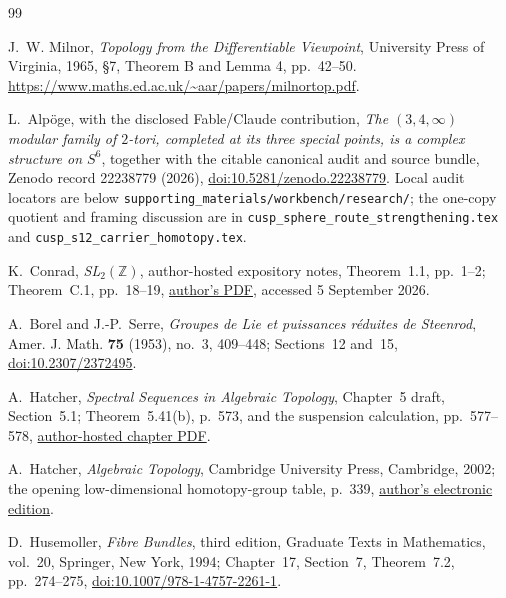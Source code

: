 \begingroup
\sloppy
\raggedright
\begin{thebibliography}{99}

J.~W. Milnor, \emph{Topology from the Differentiable Viewpoint},
University Press of Virginia, 1965, \S7, Theorem B and Lemma 4,
pp.~42--50.
\url{https://www.maths.ed.ac.uk/~aar/papers/milnortop.pdf}.



L.~Alp\"oge, with the disclosed Fable/Claude contribution,
\emph{The \((3,4,\infty)\) modular family of \(2\)-tori, completed at its
three special points, is a complex structure on \(S^6\)}, together with
the citable canonical audit and source bundle, Zenodo record 22238779
(2026), \href{https://doi.org/10.5281/zenodo.22238779}
{doi:10.5281/zenodo.22238779}.  Local audit locators are below
\texttt{supporting\_materials/workbench/research/}; the one-copy quotient
and framing discussion are in
\texttt{cusp\_sphere\_route\_strengthening.tex} and
\texttt{cusp\_s12\_carrier\_homotopy.tex}.

K.~Conrad, \emph{SL\(_2(\mathbb Z)\)}, author-hosted expository notes,
Theorem~1.1, pp.~1--2; Theorem~C.1, pp.~18--19,
\href{https://kconrad.math.uconn.edu/blurbs/grouptheory/SL(2,Z).pdf}
{author's PDF}, accessed 5 September 2026.

A.~Borel and J.-P.~Serre,
\emph{Groupes de Lie et puissances r\'eduites de Steenrod},
Amer. J. Math. \textbf{75} (1953), no.~3, 409--448;
Sections~12 and~15,
\href{https://doi.org/10.2307/2372495}{doi:10.2307/2372495}.

A.~Hatcher,
\emph{Spectral Sequences in Algebraic Topology}, Chapter~5 draft,
Section~5.1; Theorem~5.41(b), p.~573, and the suspension calculation,
pp.~577--578,
\href{https://pi.math.cornell.edu/~hatcher/AT/ATch5.pdf}
{author-hosted chapter PDF}.

A.~Hatcher,
\emph{Algebraic Topology},
Cambridge University Press, Cambridge, 2002; the opening
low-dimensional homotopy-group table, p.~339,
\href{https://pi.math.cornell.edu/~hatcher/AT/ATpage.html}
{author's electronic edition}.

D.~Husemoller,
\emph{Fibre Bundles}, third edition,
Graduate Texts in Mathematics, vol.~20, Springer, New York, 1994;
Chapter~17, Section~7, Theorem~7.2, pp.~274--275,
\href{https://doi.org/10.1007/978-1-4757-2261-1}
{doi:10.1007/978-1-4757-2261-1}.


\end{thebibliography}
